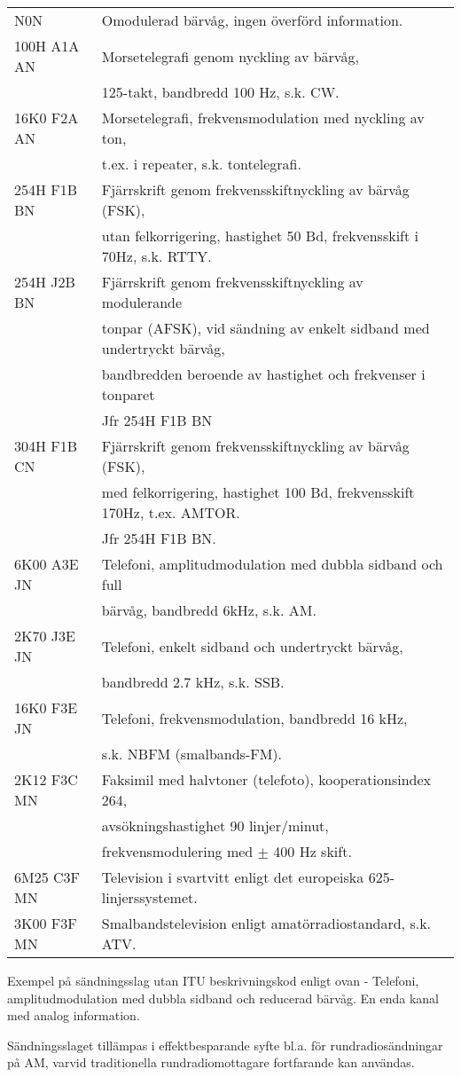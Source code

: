 \begin{tabular}{ll}
	N0N & Omodulerad bärvåg, ingen överförd information.\\
	100H A1A AN & Morsetelegrafi genom nyckling av bärvåg,\\
	& 125-takt, bandbredd 100 Hz, s.k. CW.\\
	16K0 F2A AN & Morsetelegrafi, frekvensmodulation med nyckling av ton,\\
	& t.ex. i repeater, s.k. tontelegrafi.\\
	254H F1B BN & Fjärrskrift genom frekvensskiftnyckling av bärvåg (FSK),\\
	& utan felkorrigering, hastighet 50 Bd, frekvensskift i 70Hz, s.k. RTTY.\\
	254H J2B BN & Fjärrskrift genom frekvensskiftnyckling av modulerande\\
	& tonpar (AFSK), vid sändning av enkelt sidband med undertryckt bärvåg,\\
	& bandbredden beroende av hastighet och frekvenser i tonparet\\
	& Jfr 254H F1B BN\\
	304H F1B CN & Fjärrskrift genom frekvensskiftnyckling av bärvåg (FSK),\\
	& med felkorrigering, hastighet 100 Bd, frekvensskift 170Hz, t.ex. AMTOR.\\
	& Jfr 254H F1B BN.\\
	6K00 A3E JN & Telefoni, amplitudmodulation med dubbla sidband och full\\
	& bärvåg, bandbredd 6kHz, s.k. AM.\\
	2K70 J3E JN & Telefoni, enkelt sidband och undertryckt bärvåg,\\
	& bandbredd 2.7 kHz, s.k. SSB.\\
	16K0 F3E JN & Telefoni, frekvensmodulation, bandbredd 16 kHz,\\
	& s.k. NBFM (smalbands-FM).\\
	2K12 F3C MN & Faksimil med halvtoner (telefoto), kooperationsindex 264,\\
	& avsökningshastighet 90 linjer/minut,\\
	& frekvensmodulering med \(\pm\) 400 Hz skift.\\
	6M25 C3F MN & Television i svartvitt enligt det europeiska 625-linjerssystemet.\\
	3K00 F3F MN & Smalbandstelevision enligt amatörradiostandard, s.k. ATV.\\
\end{tabular}

Exempel på sändningsslag utan ITU beskrivningskod enligt ovan
- Telefoni, amplitudmodulation med dubbla sidband och reducerad bärvåg.
En enda kanal med analog information.

Sändningsslaget tillämpas i effektbesparande syfte bl.a. för rundradiosändningar
på AM, varvid traditionella rundradiomottagare fortfarande kan användas.
